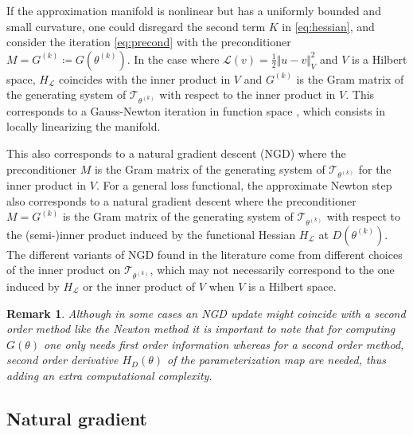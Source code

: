 \documentclass{article}
\theoremstyle{noparens}
\newtheorem{remark}{Remark}[section]
\newcommand{\cL}{\mathcal{L}}
\newcommand{\cT}{\mathcal{T}}
\newcommand{\paramk}{\theta^{(k)}}
\begin{document}
If the approximation manifold is nonlinear but has a uniformly bounded and small curvature, one could disregard the second term $K$ in \eqref{eq:hessian}, and consider the iteration \eqref{eq:precond} with the preconditioner $M = G^{(k)} \coloneqq G(\paramk).$
In the case where $\cL(v) = \frac{1}{2}\Vert u - v \Vert_V^2$ and $V$ is a Hilbert space, $H_\cL$ coincides with the inner product in $V$ and $G^{(k)}$ is the Gram matrix of the generating system of $\cT_{\paramk}$ with respect to the inner product in $V$. This corresponds to a Gauss-Newton  iteration in function space \cite{martensNewInsightsPerspectives2020}, which consists in locally linearizing the manifold.


This also corresponds to a natural gradient descent (NGD) where the preconditioner $M$ is the  Gram matrix of the generating system of $\cT_{\paramk}$ for the inner product in $V$.
For a  general loss functional, the approximate Newton step also
corresponds to a natural gradient descent  where the preconditioner
$ M =  G^{(k)}$ is the Gram matrix
of the generating system of $\cT_{\paramk}$ with respect to the (semi-)inner product induced by
the functional Hessian $H_\cL$ at $D(\paramk)$.
The different variants of NGD found in the literature come from different choices of the inner product on $\cT_{\paramk}$, which may not necessarily correspond to the one induced by $H_\cL$ or the inner product of $V$ when $V$ is a Hilbert space.

\begin{remark}
Although in some cases an NGD update might coincide with a second order method like the Newton method it is important to note that for computing $G(\theta)$ one only needs first order information whereas for a second order method, second order derivative $H_D(\theta)$ of the parameterization map are needed, thus adding an extra computational complexity.
\end{remark}

\subsection{Natural gradient}
\label{sec:nat-grad}
\end{document}
